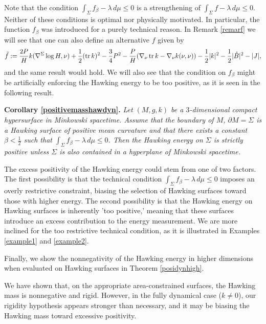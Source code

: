 \documentclass[12pt,a4paper]{amsart}
\theoremstyle{plain}
\theoremstyle{definition}
\newcommand{\tr}{\operatorname{tr}}
\begin{document}
 Note that the condition \( \int_\Sigma f_\beta -\lambda \, d\mu \leq 0 \) is a strengthening of \( \int_\Sigma f -\lambda \, d\mu \leq 0 \). Neither of these conditions is optimal nor physically motivated. In particular, the function $f_\beta$ was introduced for a purely technical reason. In Remark \ref{remarf} we will see that one can also define an alternative $f$ given by  $$\Tilde{f}:= \frac{2P}{H}  k(\nabla^\Sigma \log H, \nu)+ \frac{1}{2 }(\tr k)^2    - \frac{3}{4} P^2- \frac{P}{H}( \nabla_\nu \tr k - \nabla_\nu k(\nu,\nu )) -  \frac{1}{2} |k|^2  -\frac{1}{2} |\mathring{B}|^2 -|J|,$$ and the same result would hold.  We will also see that the condition  on \( f_\beta  \) might be artificially enforcing the Hawking energy to be too positive, as it is seen in the following result.


\noindent\textbf{Corollary \ref{positivemasshawdyn}.} \emph{Let $(M,g,k)$ be a $3$-dimensional compact hypersurface in Minkowski spacetime. Assume that the boundary of $M $, $\partial M =\Sigma $   is a Hawking surface of positive mean curvature and that there exists a constant $\beta <\frac{1}{2}$ such that $\int_\Sigma f_\beta -\lambda \, d\mu \leq 0$. Then the Hawking energy on $\Sigma$ is strictly positive unless $\Sigma$ is also  contained in a hyperplane of Minkowski spacetime.}

The excess positivity of the Hawking energy could stem from one of two factors. The first possibility is that the technical condition \( \int_\Sigma f_\beta -\lambda \, d\mu \leq 0 \) imposes an overly restrictive constraint, biasing the selection of Hawking surfaces toward those with higher energy. The second possibility is that the Hawking energy on Hawking surfaces is inherently 'too positive,' meaning that these surfaces introduce an excess contribution to the energy measurement.  We are more inclined for the too restrictive technical condition, as it is illustrated in Examples \ref{example1} and \ref{example2}. 
 
 

Finally, we show the nonnegativity of the Hawking energy in higher dimensions when evaluated on Hawking surfaces in Theorem \ref{posidynhigh}. 


We have shown that, on the appropriate area-constrained surfaces, the Hawking mass is nonnegative and rigid. However, in the fully dynamical case ($k\neq0$), our rigidity hypothesis appears stronger than necessary, and it may be biasing the Hawking mass toward excessive positivity.
\end{document}

